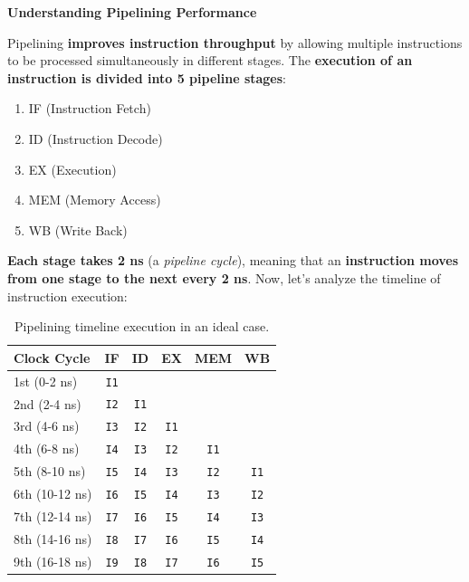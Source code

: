 \begin{flushleft}
    \textcolor{Green3}{ \textbf{Understanding Pipelining Performance}}
\end{flushleft}
Pipelining \textbf{improves instruction throughput} by allowing multiple instructions to be processed simultaneously in different stages. The \textbf{execution of an instruction is divided into 5 pipeline stages}:
\begin{enumerate}
    \item IF (Instruction Fetch)
    \item ID (Instruction Decode)
    \item EX (Execution)
    \item MEM (Memory Access)
    \item WB (Write Back)
\end{enumerate}
\textbf{Each stage takes 2 ns} (a \emph{pipeline cycle}), meaning that an \textbf{instruction moves from one stage to the next every 2 ns}. Now, let's analyze the timeline of instruction execution:
\begin{table}[!htp]
    \centering
    \begin{tabular}{@{} l | c | c | c | c | c @{}}
        \toprule
        \textbf{Clock Cycle} & \textbf{IF} & \textbf{ID} & \textbf{EX} & \textbf{MEM} & \textbf{WB} \\
        \midrule
        1st  (0-2 ns)   & \texttt{I1} &    &    &    &    \\ [.3em]
        2nd  (2-4 ns)   & \texttt{I2} & \texttt{I1} &    &    &    \\ [.3em]
        3rd  (4-6 ns)   & \texttt{I3} & \texttt{I2} & \texttt{I1} &    &    \\ [.3em]
        4th  (6-8 ns)   & \texttt{I4} & \texttt{I3} & \texttt{I2} & \texttt{I1} &    \\ [.3em]
        5th  (8-10 ns)  & \texttt{I5} & \texttt{I4} & \texttt{I3} & \texttt{I2} & \texttt{I1} \\ [.3em]
        6th  (10-12 ns) & \texttt{I6} & \texttt{I5} & \texttt{I4} & \texttt{I3} & \texttt{I2} \\ [.3em]
        7th  (12-14 ns) & \texttt{I7} & \texttt{I6} & \texttt{I5} & \texttt{I4} & \texttt{I3} \\ [.3em]
        8th  (14-16 ns) & \texttt{I8} & \texttt{I7} & \texttt{I6} & \texttt{I5} & \texttt{I4} \\ [.3em]
        9th  (16-18 ns) & \texttt{I9} & \texttt{I8} & \texttt{I7} & \texttt{I6} & \texttt{I5} \\
        \bottomrule
    \end{tabular}
    \caption{Pipelining timeline execution in an ideal case.}
\end{table}
